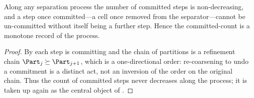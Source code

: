 \begin{corollary}
\label{cor:monotone-commit}
Along any separation process the number of committed steps is non-decreasing, and
a step once committed---a cell once removed from the separator---cannot be
un-committed without itself being a further step. Hence the committed-count is a
monotone record of the process.
\end{corollary}

\begin{proof}
By  each step is committing and the chain of partitions is a
refinement chain $\Part_j\succeq\Part_{j+1}$, which is a one-directional order:
re-coarsening to undo a commitment is a distinct act, not an inversion of the
order on the original chain. Thus the count of committed steps never decreases
along the process; it is taken up again as the central object of
.
\end{proof}
